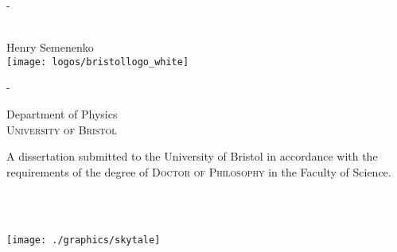 \begin{titlingpage}
\pagecolor{bristol-red}
\begin{SingleSpace}
\calccentering{\unitlength} 
\begin{adjustwidth*}{\unitlength}{-\unitlength}
\vspace*{5mm}
\begin{center}
\vspace{20mm}
\begin{minipage}{10cm}
\HUGE \color{white} \textbf{\mytitle}
\end{minipage}\\
\vspace{30mm}
{\huge\color{white}Henry Semenenko\textsc{}}\\
\vspace*{\fill}
\texttt{[image: logos/bristollogo\_white]}\\
\end{center}
\end{adjustwidth*}
\end{SingleSpace}
\clearpage
\pagecolor{white}
\clearemptydoublepage
\begin{SingleSpace}
\pagecolor{bristol-red}
\thispagestyle{plain}
\calccentering{\unitlength} 
\begin{adjustwidth*}{\unitlength}{-\unitlength}
\vspace*{0mm}
\begin{center}
\vspace{20mm}
{\color{white}\Large Department of Physics\\
\textsc{University of Bristol}}\\
\vspace{40mm}
\begin{minipage}{9cm}
\color{white}
A dissertation submitted to the University of Bristol in accordance with the requirements of the degree of \textsc{Doctor of Philosophy} in the Faculty of Science.
\end{minipage}\\
\vspace*{\fill}

\vspace{10mm}
{\color{white}\large\textsc{ }}\\
\vspace{10mm}
\texttt{[image: ./graphics/skytale]}
\end{center}
\end{adjustwidth*}
\end{SingleSpace}
\clearpage
\nopagecolor
\cleartooddpage[\emptypage]
\end{titlingpage}